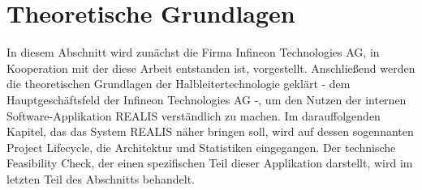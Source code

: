 \chapter{Theoretische Grundlagen}\label{Chap:TheoretischeGrundlagen}
In diesem Abschnitt wird zunächst die Firma Infineon Technologies AG, in Kooperation mit der diese Arbeit entstanden ist, vorgestellt. Anschließend werden die theoretischen Grundlagen der Halbleitertechnologie geklärt - dem Hauptgeschäftsfeld der Infineon Technologies AG -, um den Nutzen der internen Software-Applikation \gls{REALIS} verständlich zu machen. Im darauffolgenden Kapitel, das das System \gls{REALIS} näher bringen soll, wird auf dessen sogennanten Project Lifecycle, die Architektur und Statistiken eingegangen. Der technische Feasibility Check, der einen spezifischen Teil dieser Applikation darstellt, wird im letzten Teil des Abschnitts behandelt.




